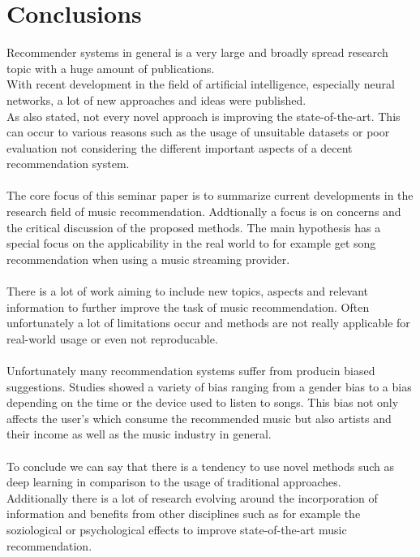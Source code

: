 \documentclass[runningheads,a4paper]{llncs}
\begin{document}
\section{Conclusions}
Recommender systems in general is a very large and broadly spread research topic with a huge amount of publications.\\
With recent development in the field of artificial intelligence, especially neural networks, a lot of new approaches and ideas were published.\\
As also \cite{cremonesi2021progress} stated, not every novel approach is improving the state-of-the-art. This can occur to various reasons such as the usage of unsuitable datasets or poor evaluation not considering the different important aspects of a decent recommendation system.\\
\\
The core focus of this seminar paper is to summarize current developments in the research field of music recommendation. 
Addtionally a focus is on concerns and the critical discussion of the proposed methods. The main hypothesis has a special focus on the 
applicability in the real world to for example get song recommendation when using a music streaming provider.\\
\\
There is a lot of work aiming to include new topics, aspects and relevant information to further improve the task of music recommendation. 
Often unfortunately a lot of limitations occur and methods are not really applicable for real-world usage or even not reproducable. \\
\\
Unfortunately many recommendation systems suffer from producin biased suggestions. Studies showed a variety of bias ranging from a gender bias to a bias depending on the time or the device used to listen to songs. This bias not only 
affects the user's which consume the recommended music but also artists and their income as well as the music industry in general. \\
\\
To conclude we can say that there is a tendency to use novel methods such as deep learning in comparison to the usage of traditional approaches.\\
Additionally there is a lot of research evolving around the incorporation of information and benefits from other disciplines such as 
for example the soziological or psychological effects to improve state-of-the-art music recommendation. \\
\end{document}
